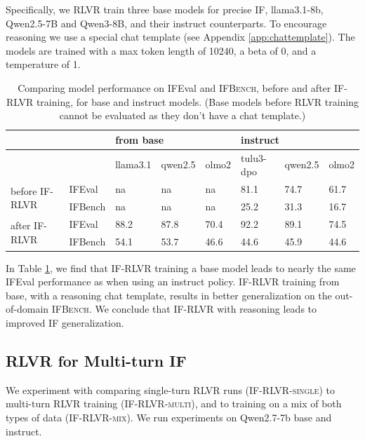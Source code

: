 \documentclass{article}
\newcommand{\benchname}{\textsc{IFBench}\xspace}
\begin{document}
Specifically, we RLVR train three base models for precise IF, llama3.1-8b, Qwen2.5-7B and Qwen3-8B, and their instruct counterparts. To encourage reasoning we use a special chat template (see Appendix \ref{app:chattemplate}). The models are trained with a max token length of 10240, a beta of 0, and a temperature of 1.

\begin{table}[]
\centering   
        \caption{Comparing model performance on IFEval and \benchname, before and after IF-RLVR training, for base and instruct models. (Base models before RLVR training cannot be evaluated as they don't have a chat template.)}    \label{tab:base}
\begin{tabular}{llllllll} \toprule
                                &         & \multicolumn{3}{l}{from base} & \multicolumn{3}{l}{instruct} \\ \midrule
                                &         & llama3.1  & qwen2.5  & olmo2  & tulu3-dpo  & qwen2.5 & olmo2 \\ \midrule
\multirow{2}{*}{before IF-RLVR} & IFEval  & na        & na       & na     & 81.1       & 74.7    & 61.7  \\
                                & IFBench & na        & na       & na     & 25.2       & 31.3    & 16.7  \\
\multirow{2}{*}{after IF-RLVR}  & IFEval  & 88.2      & 87.8     & 70.4   & 92.2       & 89.1    &  74.5     \\
                                & IFBench & 54.1      & 53.7     & 46.6   & 44.6       & 45.9    &   44.6   \\ \bottomrule   
\end{tabular}
\end{table}

In Table \ref{tab:base}, we find that IF-RLVR training a base model leads to nearly the same IFEval performance as when using an instruct policy. IF-RLVR training from base, with a reasoning chat template, results in better generalization on the out-of-domain \benchname. We conclude that IF-RLVR with reasoning leads to improved IF generalization.


\subsection{RLVR for Multi-turn IF}
We experiment with comparing single-turn RLVR runs (IF-RLVR-\textsc{single}) to multi-turn RLVR training (IF-RLVR-\textsc{multi}), and to training on a mix of both types of data (IF-RLVR-\textsc{mix}). We run experiments on Qwen2.7-7b base and instruct. 
\end{document}

